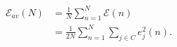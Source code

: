 \begin{equation}
\label{eq:costfunction}
\begin{align*}
\mathscr{E}_{av}(N) &= \frac{1}{N} \sum_{n=1}^{N}{\mathscr{E}(n)} \\
					&= \frac{1}{2N} \sum_{n=1}^{N}{\sum_{j \in C}{\mathit{e}_j^2(n)}} .
\end{align*}
\end{equation}
